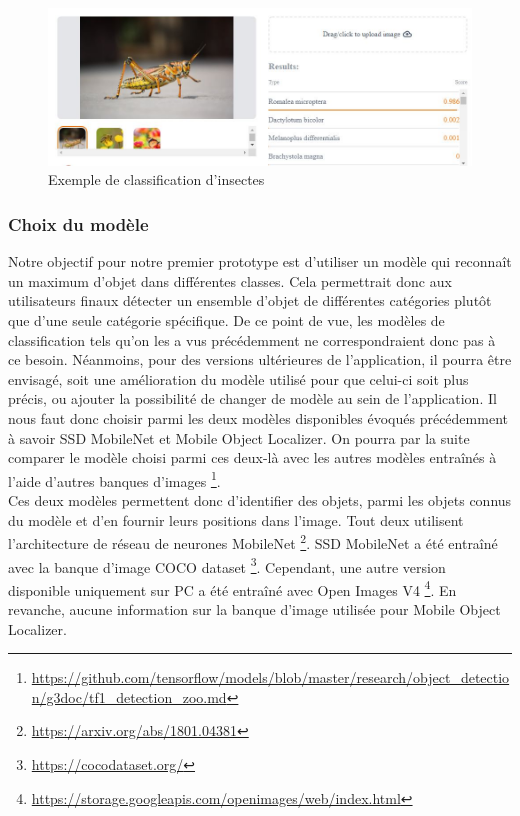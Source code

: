 \documentclass[UTF8]{EPURapport}
\begin{document}
\newpage

\begin{figure}[h!]
\centering
  \includegraphics[width=\textwidth]{images/insects_classification.jpg}
  \caption{Exemple de classification d'insectes}
  \label{fig:insectsclassification}
\end{figure}

\subsubsection{Choix du modèle} \label{choixmodele}
Notre objectif pour notre premier prototype est d'utiliser un modèle qui reconnaît un maximum d'objet dans différentes classes. Cela permettrait donc aux utilisateurs finaux détecter un ensemble d'objet de différentes catégories plutôt que d'une seule catégorie spécifique. De ce point de vue, les modèles de classification tels qu'on les a vus précédemment ne correspondraient donc pas à ce besoin. Néanmoins, pour des versions ultérieures de l'application, il pourra être envisagé, soit une amélioration du modèle utilisé pour que celui-ci soit plus précis, ou ajouter la possibilité de changer de modèle au sein de l'application. Il nous faut donc choisir parmi les deux modèles disponibles évoqués précédemment à savoir SSD MobileNet et Mobile Object Localizer. On pourra par la suite comparer le modèle choisi parmi ces deux-là avec les autres modèles entraînés à l'aide d'autres banques d'images \footnote{\url{https://github.com/tensorflow/models/blob/master/research/object_detection/g3doc/tf1_detection_zoo.md}}. \\

Ces deux modèles permettent donc d'identifier des objets, parmi les objets connus du modèle et d'en fournir leurs positions dans l'image. Tout deux utilisent l'architecture de réseau de neurones MobileNet \footnote{\url{https://arxiv.org/abs/1801.04381}}. SSD MobileNet a été entraîné avec la banque d'image COCO dataset \footnote{\url{https://cocodataset.org/}}. Cependant, une autre version disponible uniquement sur PC a été entraîné avec Open Images V4 \footnote{\url{https://storage.googleapis.com/openimages/web/index.html}}. En revanche, aucune information sur la banque d'image utilisée pour Mobile Object Localizer.
\end{document}
